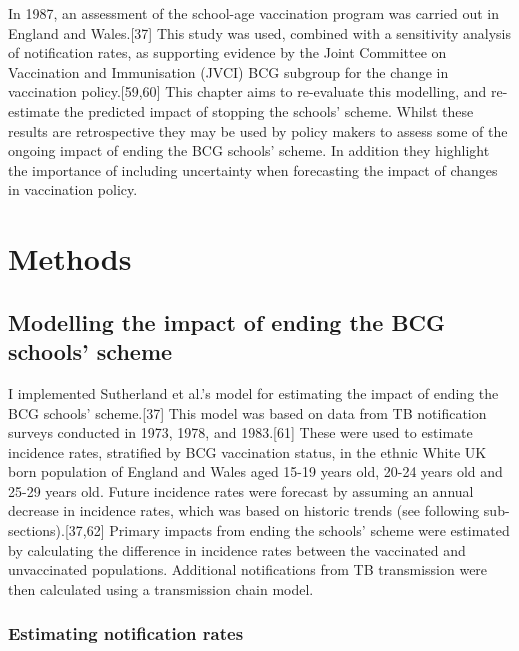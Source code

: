 \documentclass[11pt,twoside]{bristolthesis}
\begin{document}
  In 1987, an assessment of the school-age vaccination program was carried out in England and Wales.{[}37{]} This study was used, combined with a sensitivity analysis of notification rates, as supporting evidence by the Joint Committee on Vaccination and Immunisation (JVCI) BCG subgroup for the change in vaccination policy.{[}59,60{]} This chapter aims to re-evaluate this modelling, and re-estimate the predicted impact of stopping the schools' scheme. Whilst these results are retrospective they may be used by policy makers to assess some of the ongoing impact of ending the BCG schools' scheme. In addition they highlight the importance of including uncertainty when forecasting the impact of changes in vaccination policy.
  
  \hypertarget{methods}{%
  \section{Methods}\label{methods}}
  
  \hypertarget{modelling-the-impact-of-ending-the-bcg-schools-scheme}{%
  \subsection{Modelling the impact of ending the BCG schools' scheme}\label{modelling-the-impact-of-ending-the-bcg-schools-scheme}}
  
  I implemented Sutherland et al.'s model for estimating the impact of ending the BCG schools' scheme.{[}37{]} This model was based on data from TB notification surveys conducted in 1973, 1978, and 1983.{[}61{]} These were used to estimate incidence rates, stratified by BCG vaccination status, in the ethnic White UK born population of England and Wales aged 15-19 years old, 20-24 years old and 25-29 years old. Future incidence rates were forecast by assuming an annual decrease in incidence rates, which was based on historic trends (see following sub-sections).{[}37,62{]} Primary impacts from ending the schools' scheme were estimated by calculating the difference in incidence rates between the vaccinated and unvaccinated populations. Additional notifications from TB transmission were then calculated using a transmission chain model.
  
  \hypertarget{estimating-notification-rates}{%
  \subsubsection{Estimating notification rates}\label{estimating-notification-rates}}
  
\end{document}
